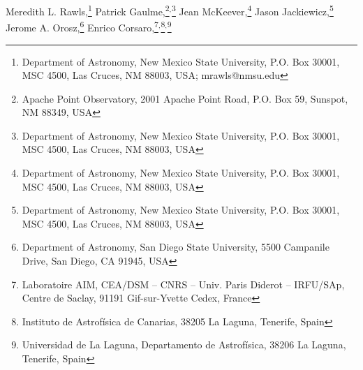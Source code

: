 Meredith L. Rawls,\footnote{Department of Astronomy, New Mexico State University, P.O. Box 30001, MSC 4500, Las Cruces, NM 88003, USA; mrawls@nmsu.edu}
\setcounter{footnote}{1}
Patrick Gaulme,\footnote{Apache Point Observatory, 2001 Apache Point Road, P.O. Box 59, Sunspot, NM 88349, USA}\setcounter{footnote}{0}$^{,}$\footnote{Department of Astronomy, New Mexico State University, P.O. Box 30001, MSC 4500, Las Cruces, NM 88003, USA}
\setcounter{footnote}{0}
Jean McKeever,\footnote{Department of Astronomy, New Mexico State University, P.O. Box 30001, MSC 4500, Las Cruces, NM 88003, USA}
\setcounter{footnote}{0}
Jason Jackiewicz,\footnote{Department of Astronomy, New Mexico State University, P.O. Box 30001, MSC 4500, Las Cruces, NM 88003, USA}
\setcounter{footnote}{2}
Jerome A. Orosz,\footnote{Department of Astronomy, San Diego State University, 5500 Campanile Drive, San Diego, CA 91945, USA}
Enrico Corsaro,\footnote{Laboratoire AIM, CEA/DSM – CNRS – Univ. Paris Diderot – IRFU/SAp, Centre de Saclay, 91191 Gif-sur-Yvette Cedex, France}$^{,}$\footnote{Instituto de Astrof\'isica de Canarias, 38205 La Laguna, Tenerife, Spain}$^{,}$\footnote{Universidad de La Laguna, Departamento de Astrof\'isica, 38206 La Laguna, Tenerife, Spain}
